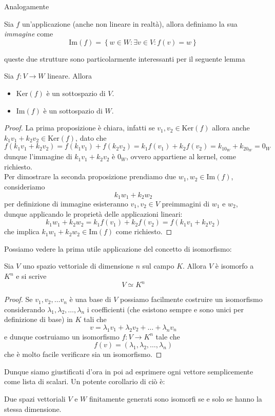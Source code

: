 \documentclass[11pt]{scrartcl}
\newcommand{\Immagine}[1]{\text{Im}\left(#1\right)}
\renewcommand{\ker}[1]{\text{Ker}\left(#1\right)}
\begin{document}
 	 Analogamente 
 	 \begin{definition}[Immagine]
 	 	Sia $f$ un'applicazione (anche non lineare in realtà), allora definiamo la sua \textit{immagine} come 
 	 	$$\Immagine{f}=\left\{w\in W : \exists v \in V : f(v)=w\right\}$$
 	 \end{definition}
 	 queste due strutture sono particolarmente interessanti per il seguente lemma
 	 \begin{lemma}
 	 	Sia $f:V\to W$ lineare. Allora 
 	 	\begin{itemize}
 	 		\item $\ker{f}$ è un sottospazio di $V$.
 	 		\item $\Immagine{f}$ è un sottospazio di $W$.
 	 	\end{itemize}
 	 \end{lemma}
 	 \begin{proof}
 	 	La prima proposizione è chiara, infatti se $v_1,v_2\in \ker{f}$ allora anche $k_1v_1+k_2v_2\in \ker{f}$, dato che 
 	 	$$f(k_1v_1+k_2v_2)=f(k_1v_1)+f(k_2v_2)=k_1f(v_1)+k_2f(v_2)=k_10_W+k_20_W=0_W$$
 	 	dunque l'immagine di $k_1v_1+k_2v_2$ è $0_W$, ovvero appartiene al kernel, come richiesto. \\
 	 	Per dimostrare la seconda proposizione prendiamo due $w_1,w_2\in \Immagine{f}$, consideriamo
 	 	$$k_1w_1+k_2w_2$$ 
 	 	per definizione di immagine esisteranno $v_1,v_2\in V$ preimmagini di $w_1$ e $w_2$, dunque applicando le proprietà delle applicazioni lineari:
 	 	$$k_1w_1+k_2w_2=k_1f(v_1)+k_2f(v_2)=f(k_1v_1+k_2v_2)$$
 	 	che implica $k_1w_1+k_2w_2\in\Immagine{f}$ come richiesto.
 	 \end{proof}
 	 Possiamo vedere la prima utile applicazione del concetto di isomorfismo:
 	 \begin{theorem}
 	 	Sia $V$ uno spazio vettoriale di dimensione $n$ sul campo $K$. Allora $V$ è isomorfo a $K^n$ e si scrive
 	 	$$V \simeq K^n$$
 	 \end{theorem}
 	 \begin{proof}
 	 	Se $v_1,v_2,\dots v_n$ è una base di $V$ possiamo facilmente costruire un isomorfismo considerando $\lambda_1,\lambda_2,\dots,\lambda_n$ i coefficienti (che esistono sempre e sono unici per definizione di base) in $K$ tali che
 	 	$$v=\lambda_1v_1+\lambda_2v_2+\dots+\lambda_nv_n$$
 	 	e dunque costruiamo un isomorfismo $f:V\to K^n$ tale che
 	 	$$f(v)=(\lambda_1,\lambda_2,\dots,\lambda_n)$$
 	 	che è molto facile verificare sia un isomorfismo.
 	 \end{proof}
 	 Dunque siamo giustificati d'ora in poi ad esprimere ogni vettore semplicemente come lista di scalari. Un potente corollario di ciò è:
 	 \begin{corollary}
 	 	Due spazi vettoriali $V$ e $W$ finitamente generati sono isomorfi se e solo se hanno la stessa dimensione.
 	 \end{corollary}
\end{document}
